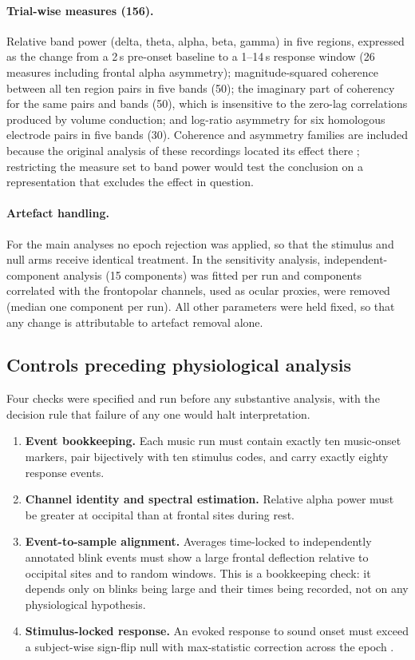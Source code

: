\paragraph{Trial-wise measures (156).}
Relative band power (delta, theta, alpha, beta, gamma) in five regions, expressed
as the change from a 2\,s pre-onset baseline to a 1--14\,s response window (26
measures including frontal alpha asymmetry); magnitude-squared coherence between
all ten region pairs in five bands (50); the imaginary part of coherency for the
same pairs and bands (50), which is insensitive to the zero-lag correlations
produced by volume conduction; and log-ratio asymmetry for six homologous electrode
pairs in five bands (30). Coherence and asymmetry families are included because the
original analysis of these recordings located its effect there \citep{daly2014};
restricting the measure set to band power would test the conclusion on a
representation that excludes the effect in question.

\paragraph{Artefact handling.}
For the main analyses no epoch rejection was applied, so that the stimulus and null
arms receive identical treatment. In the sensitivity analysis,
independent-component analysis (15 components) was fitted per run and components
correlated with the frontopolar channels, used as ocular proxies, were removed
(median one component per run). All other parameters were held fixed, so that any
change is attributable to artefact removal alone.

\subsection*{Controls preceding physiological analysis}

Four checks were specified and run before any substantive analysis, with the
decision rule that failure of any one would halt interpretation.

\begin{enumerate}
\item \textbf{Event bookkeeping.} Each music run must contain exactly ten
music-onset markers, pair bijectively with ten stimulus codes, and carry exactly
eighty response events.
\item \textbf{Channel identity and spectral estimation.} Relative alpha power must
be greater at occipital than at frontal sites during rest.
\item \textbf{Event-to-sample alignment.} Averages time-locked to independently
annotated blink events must show a large frontal deflection relative to occipital
sites and to random windows. This is a bookkeeping check: it depends only on blinks
being large and their times being recorded, not on any physiological hypothesis.
\item \textbf{Stimulus-locked response.} An evoked response to sound onset must
exceed a subject-wise sign-flip null with max-statistic correction across the epoch
\citep{maris2007}.
\end{enumerate}

